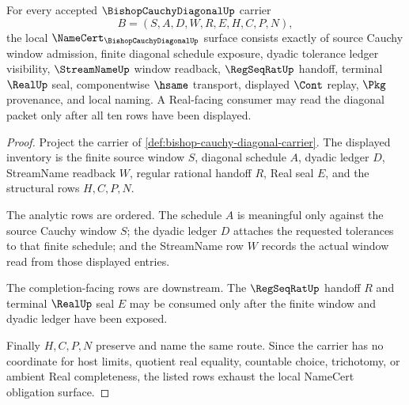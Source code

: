 \begin{theorem}
\label{thm:bishop-cauchy-diagonal-namecert-obligations}
For every accepted $\BishopCauchyDiagonalUp$ carrier
$$
B=(S,A,D,W,R,E,H,C,P,N),
$$
the local $\NameCert_{\BishopCauchyDiagonalUp}$ surface consists exactly of source Cauchy window admission, finite diagonal schedule exposure, dyadic tolerance ledger visibility, $\StreamNameUp$ window readback, $\RegSeqRatUp$ handoff, terminal $\RealUp$ seal, componentwise $\hsame$ transport, displayed $\Cont$ replay, $\Pkg$ provenance, and local naming. A Real-facing consumer may read the diagonal packet only after all ten rows have been displayed.
\end{theorem}
\begin{proof}
Project the carrier of \autoref{def:bishop-cauchy-diagonal-carrier}. The displayed inventory is the finite source window $S$, diagonal schedule $A$, dyadic ledger $D$, StreamName readback $W$, regular rational handoff $R$, Real seal $E$, and the structural rows $H,C,P,N$.

The analytic rows are ordered. The schedule $A$ is meaningful only against the source Cauchy window $S$; the dyadic ledger $D$ attaches the requested tolerances to that finite schedule; and the StreamName row $W$ records the actual window read from those displayed entries.

The completion-facing rows are downstream. The $\RegSeqRatUp$ handoff $R$ and terminal $\RealUp$ seal $E$ may be consumed only after the finite window and dyadic ledger have been exposed.

Finally $H,C,P,N$ preserve and name the same route. Since the carrier has no coordinate for host limits, quotient real equality, countable choice, trichotomy, or ambient Real completeness, the listed rows exhaust the local NameCert obligation surface.
\end{proof}


